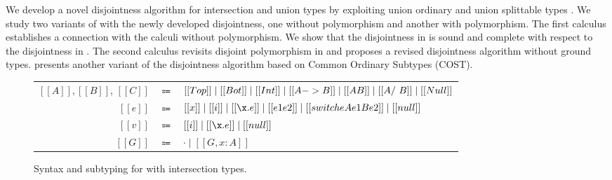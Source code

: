 
We develop a novel disjointness algorithm for
intersection and union types
by exploiting union ordinary and union splittable types \citep{huang2021distributing}.
We study two variants of \name with the newly developed disjointness,
one without polymorphism and another with polymorphism.
The first calculus establishes
a connection with the calculi without polymorphism. We show that the disjointness
in  is sound and complete with respect to the disjointness
in .
The second calculus revisits disjoint polymorphism in
 and proposes a
revised disjointness algorithm without ground types.
 presents another variant of the disjointness
algorithm based on Common Ordinary Subtypes (COST).





\begin{figure}[t]
      \begin{small}
      \begin{center}
        \begin{tabular}{rcl}
          \toprule
          $[[A]], [[B]]$, $[[C]]$ & $\Coloneqq$ & $ [[Top]] \mid [[Bot]] \mid [[Int]] \mid [[A -> B]] \mid [[A \/ B]] \mid [[A /\ B]] \mid [[Null]] $ \\
          $[[e]]$ & $\Coloneqq$ & $ [[x]] \mid [[i]] \mid [[\x.e]] \mid [[e1 e2]] \mid [[switch e A e1 B e2]] \mid [[null]]$\\
          $[[v]]$ & $\Coloneqq$ & $ [[i]] \mid [[\x.e]] \mid [[null]] $ \\
          $[[G]]$ & $\Coloneqq$ & $ \cdot \mid [[G , x : A]] $ \\
          \bottomrule
        \end{tabular}

      \end{center}
      \end{small}
  \caption{Syntax and subtyping for \name with intersection types.}
  \label{fig:rev:disj:syntax:sub}
\end{figure}

